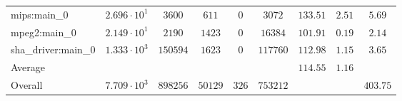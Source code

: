 \begin{tabular}{|l|c|c|c|c|c|c|c|c|}
mips:main\_0            & $ 2.696 \cdot 10^{1} $ & $ 3600   $ & $ 611   $ & $ 0   $ & $ 3072   $ & $ 133.51      $ & $ 2.51    $ & $ 5.69    $ \\
mpeg2:main\_0           & $ 2.149 \cdot 10^{1} $ & $ 2190   $ & $ 1423  $ & $ 0   $ & $ 16384  $ & $ 101.91      $ & $ 0.19    $ & $ 2.14    $ \\
sha\_driver:main\_0     & $ 1.333 \cdot 10^{3} $ & $ 150594 $ & $ 1623  $ & $ 0   $ & $ 117760 $ & $ 112.98      $ & $ 1.15    $ & $ 3.65    $ \\
\hline
Average                 & $                    $ & $        $ & $       $ & $     $ & $        $ & $ 114.55      $ & $ 1.16    $ & $         $ \\
\hline
Overall                 & $ 7.709 \cdot 10^{3} $ & $ 898256 $ & $ 50129 $ & $ 326 $ & $ 753212 $ & $             $ & $         $ & $ 403.75  $ \\
\hline
\end{tabular}

